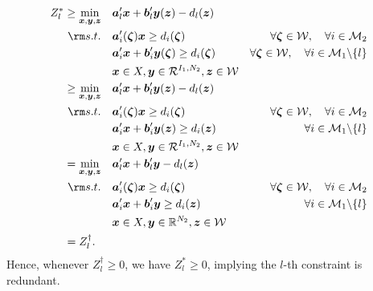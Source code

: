 \documentclass[fleqn,mnsc,blindrev]{informs4}
\newcommand{\mb}[1]{\mbox{\boldmath \ensuremath{#1}}}
\begin{document}
\begin{equation*}
			\begin{aligned} 
				Z^*_l \geq	\min_{ \boldsymbol{x} , \boldsymbol{y}, \boldsymbol{z}} \quad & \mb{a}'_l\mb{x}+\mb{b}'_l \mb{y}(\mb{z}) - d_l(\mb{z})  \\
				{\rm s.t.}  \quad &  \mb{a}'_i(\mb{\zeta})\mb{x} \geq d_i(\mb{\zeta}) &  \forall  \mb{\zeta} \in  \mathcal{W}, \quad \forall i  \in \mathcal{M}_2 \\
				\quad & \mb{a}'_i\mb{x}+ \mb{b}'_i \mb{y}(\mb{\zeta}) \geq d_i(\mb{\zeta})  &  \forall  \mb{\zeta} \in  \mathcal{W},  \quad \forall i  \in \mathcal{M}_1 \backslash \{l\} \\
				\quad &\mb{x} \in X, \mb{y} \in \mathcal{R}^{I_1,N_2},  \mb{z} \in \mathcal{W}\\
				\geq \min_{ \boldsymbol{x} , \boldsymbol{y}, \boldsymbol{z}} \quad & \mb{a}'_l\mb{x}+\mb{b}'_l \mb{y}(\mb{z}) - d_l(\mb{z})  \\
				{\rm s.t.}  \quad &  \mb{a}'_i(\mb{\zeta})\mb{x} \geq d_i(\mb{\zeta}) &  \forall  \mb{\zeta} \in  \mathcal{W}, \quad \forall i  \in \mathcal{M}_2   \\
				\quad & \mb{a}'_i\mb{x}+ \mb{b}'_i \mb{y}(\mb{z}) \geq d_i(\mb{z})  &  \forall i  \in \mathcal{M}_1 \backslash \{l\} \\
				\quad &\mb{x} \in X, \mb{y} \in \mathcal{R}^{I_1,N_2},  \mb{z} \in \mathcal{W} \\
				= \min_{ \boldsymbol{x} , \boldsymbol{y}, \boldsymbol{z}} \quad & \mb{a}'_l\mb{x}+\mb{b}'_l \mb{y} - d_l(\mb{z})  \\
				{\rm s.t.}  \quad &  \mb{a}'_i(\mb{\zeta})\mb{x} \geq d_i(\mb{\zeta}) &  \forall  \mb{\zeta} \in  \mathcal{W}, \quad \forall i  \in \mathcal{M}_2\\
				\quad & \mb{a}'_i\mb{x}+ \mb{b}'_i \mb{y} \geq d_i(\mb{z})  &  \forall i  \in \mathcal{M}_1 \backslash \{l\} \\
				\quad & \mb{x} \in X, \mb{y} \in \mathbb{R}^{N_2},  \mb{z} \in \mathcal{W} \\
				= Z^\dag_l. \enskip \quad
			\end{aligned} 
\end{equation*}
		Hence, whenever $Z^\dag_l \geq 0$, we have $Z^*_l \geq 0$, implying the $l$-th constraint is redundant.  \hfill \Halmos \\
		
\end{document}
